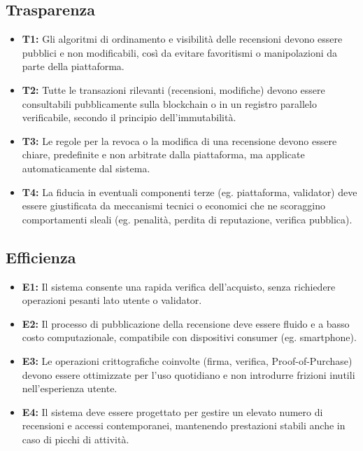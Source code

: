         \subsection{Trasparenza}
            \begin{itemize}
                \item \textbf{T1:} Gli algoritmi di ordinamento e visibilità delle recensioni devono essere pubblici e non modificabili, così da evitare favoritismi o manipolazioni da parte della piattaforma.
                
                \item \textbf{T2:} Tutte le transazioni rilevanti (recensioni, modifiche) devono essere consultabili pubblicamente sulla blockchain o in un registro parallelo verificabile, secondo il principio dell'immutabilità.
                
                \item \textbf{T3:} Le regole per la revoca o la modifica di una recensione devono essere chiare, predefinite e non arbitrate dalla piattaforma, ma applicate automaticamente dal sistema.
                
                \item \textbf{T4:} La fiducia in eventuali componenti terze (eg. piattaforma, validator) deve essere giustificata da meccanismi tecnici o economici che ne scoraggino comportamenti sleali (eg. penalità, perdita di reputazione, verifica pubblica).
            \end{itemize}
            
        \subsection{Efficienza}
            \begin{itemize}
                \item \textbf{E1:} Il sistema consente una rapida verifica dell'acquisto, senza richiedere operazioni pesanti lato utente o validator.
                
                \item \textbf{E2:} Il processo di pubblicazione della recensione deve essere fluido e a basso costo computazionale, compatibile con dispositivi consumer (eg. smartphone).
                
                \item \textbf{E3:} Le operazioni crittografiche coinvolte (firma, verifica, Proof-of-Purchase) devono essere ottimizzate per l'uso quotidiano e non introdurre frizioni inutili nell'esperienza utente.
                
                \item \textbf{E4:} Il sistema deve essere progettato per gestire un elevato numero di recensioni e accessi contemporanei, mantenendo prestazioni stabili anche in caso di picchi di attività.
            \end{itemize}
    
